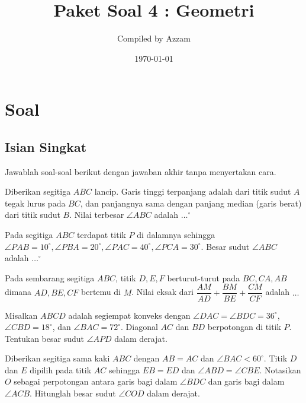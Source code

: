 \documentclass[12pt]{scrartcl}
\begin{document}
	\title{Paket Soal 4 : Geometri} %
	\date{\today}
	\author{Compiled by Azzam}
	\maketitle

\renewcommand*\contentsname{Daftar Isi}
\tableofcontents

\newpage
	\newpage
	
	\section{Soal}
\subsection{Isian Singkat}
Jawablah soal-soal berikut dengan jawaban akhir tanpa menyertakan cara.

	\begin{soalbaru}
		Diberikan segitiga $ABC$ lancip. Garis tinggi terpanjang adalah dari titik sudut $A$ tegak
			lurus pada $BC$, dan panjangnya sama dengan panjang median (garis berat) dari titik sudut $B$.
			Nilai terbesar $\angle ABC$ adalah $\dots^\circ$
	\end{soalbaru}
	
	\begin{soalbaru}
		Pada segitiga $ABC$ terdapat titik $P$ di dalamnya sehingga $\angle PAB = 10^\circ, \angle PBA = 20^\circ , \angle PAC = 40^\circ, \angle PCA = 30^\circ$. Besar sudut $\angle ABC$ adalah $\dots^\circ$ 
		
	\end{soalbaru}
	
	\begin{soalbaru}
			Pada sembarang segitiga $ABC$, titik $D,E,F$ berturut-turut pada $BC,CA,AB$ dimana $AD,BE,CF$ bertemu di $M$. Nilai eksak dari $\dfrac{AM}{AD}+\dfrac{BM}{BE}+\dfrac{CM}{CF}$ adalah $\dots$
		\end{soalbaru}
	
	\begin{soalbaru}
		Misalkan $ABCD$ adalah segiempat konveks dengan $\angle DAC=\angle BDC = 36^\circ$, $\angle CBD = 18^\circ$, dan $\angle BAC = 72^\circ$. Diagonal $AC$ dan $BD$ berpotongan di titik $P$. Tentukan besar sudut $\angle APD$ dalam derajat. %
	\end{soalbaru}
	
	\begin{soalbaru}
		Diberikan segitiga sama kaki $ABC$ dengan $AB = AC$ dan $\angle BAC < 60^\circ$. Titik $D$ dan $E$ dipilih pada titik $AC$ sehingga $EB = ED$ dan $\angle ABD = \angle CBE$. Notasikan $O$ sebagai perpotongan antara garis bagi dalam $\angle BDC$ dan garis bagi dalam $\angle ACB$. Hitunglah besar sudut $\angle COD$ dalam derajat. %
	\end{soalbaru}
	
\end{document}

